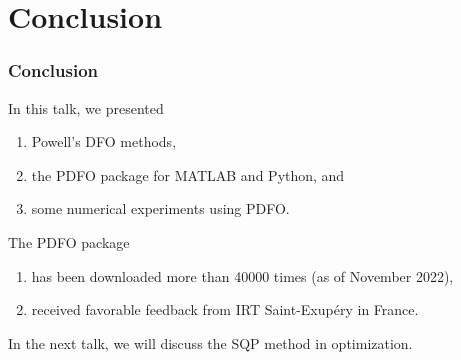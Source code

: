 \documentclass{polyu-presentation}
\newcommand{\obj}{f}
\begin{document}
\section{Conclusion}

\begin{frame}
    \frametitle{Conclusion}
    
    In this talk, we presented
    \begin{enumerate}
        \item \alert{Powell's DFO methods},
        \item the \alert{PDFO} package for MATLAB and Python, and
        \item some \alert{numerical experiments} using PDFO.
    \end{enumerate}

    \bigskip

    The PDFO package
    \begin{enumerate}
        \item has been \alert{downloaded} more than \num{40000} times (as of November 2022),
        \item received \alert{favorable feedback} from IRT Saint-Exup{\'{e}}ry in France.
    \end{enumerate}

    \bigskip

    In the next talk, we will discuss the \alert{SQP method} in optimization.
\end{frame}

\appendix




\end{document}
